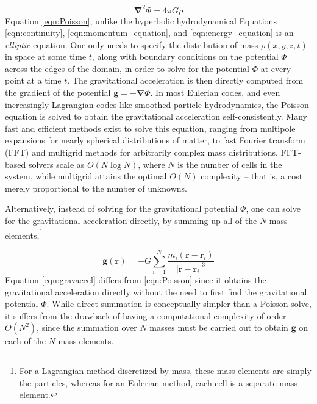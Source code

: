 \documentclass[notoc]{tufte-handout}
\renewcommand{\vec}[1]{\mathbf{#1}}
\newcommand{\del}{\vec{\nabla}}
\begin{document}
\begin {equation}
\boxed {\del^2 \Phi = 4 \pi G \rho}
\label {eqn:Poisson}
\end {equation}
%
Equation \ref {eqn:Poisson}, unlike the hyperbolic hydrodynamical Equations \ref {eqn:continuity}, \ref {eqn:momentum_equation}, and \ref {eqn:energy_equation} is an {\it elliptic} equation. One only needs to specify the distribution of mass $\rho (x, y, z, t)$ in space at some time $t$, along with boundary conditions on the potential $\Phi$ across the edges of the domain, in order to solve for the potential $\Phi$ at every point at a time $t$.  The gravitational acceleration is then directly computed from the gradient of the potential $\vec {g} = - \del \Phi$. In most Eulerian codes, and even increasingly Lagrangian codes like smoothed particle hydrodynamics, the Poisson equation is solved to obtain the gravitational acceleration self-consistently.  Many fast and efficient methods exist to solve this equation, ranging from multipole expansions for nearly spherical distributions of matter, to fast Fourier transform (FFT) and multigrid methods for arbitrarily complex mass distributions.  FFT-based solvers scale as $O(N \log N)$, where $N$ is the number of cells in the system, while multigrid attains the optimal $O(N)$ complexity -- that is, a cost merely proportional to the number of unknowns.

Alternatively, instead of solving for the gravitational potential $\Phi$, one can solve for the gravitational acceleration directly, by summing up all of the $N$ mass elements,\footnote {For a Lagrangian method discretized by mass, these mass elements are simply the particles, whereas for an Eulerian method, each cell is a separate mass element.}

\begin {equation}
\vec{g}(\vec{r}) = -G \sum_{i=1}^{N} \frac{m_i (\vec{r} - \vec{r}_i)}{|\vec{r} - \vec{r}_i|^3}
\label {eqn:gravaccel}
\end {equation}
%
Equation \ref {eqn:gravaccel} differs from \ref {eqn:Poisson} since it obtains the gravitational acceleration directly without the need to first find the gravitational potential $\Phi$. While direct summation is conceptually simpler than a Poisson solve, it suffers from the drawback of having a computational complexity of order $O(N^2)$, since the summation over $N$ masses must be carried out to obtain $\vec {g}$ on each of the $N$ mass elements.
\end{document}
